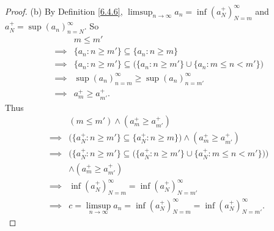 \begin{proof}{(b)}
    By Definition \ref{6.4.6}, \(\limsup_{n \to \infty} a_n = \inf(a_N^+)_{N = m}^\infty\) and \(a_N^+ = \sup(a_n)_{n = N}^\infty\).
    So
    \begin{align*}
                 & m \leq m'                                                                                \\
        \implies & \{a_n : n \geq m'\} \subseteq \{a_n : n \geq m\}                                         \\
        \implies & \{a_n : n \geq m'\} \subseteq \big(\{a_n : n \geq m'\} \cup \{a_n : m \leq n < m'\}\big) \\
        \implies & \sup(a_n)_{n = m}^\infty \geq \sup(a_n)_{n = m'}^\infty                                  \\
        \implies & a_m^+ \geq a_{m'}^+.
    \end{align*}
    Thus
    \begin{align*}
                 & (m \leq m') \land (a_m^+ \geq a_{m'}^+)                                                                    \\
        \implies & \big(\{a_N^+ : n \geq m'\} \subseteq \{a_N^+ : n \geq m\}\big) \land (a_m^+ \geq a_{m'}^+)                 \\
        \implies & \bigg(\{a_N^+ : n \geq m'\} \subseteq \big(\{a_N^+ : n \geq m'\} \cup \{a_N^+ : m \leq n < m'\}\big)\bigg) \\
                 & \land (a_m^+ \geq a_{m'}^+)                                                                                \\
        \implies & \inf(a_N^+)_{N = m}^\infty = \inf(a_N^+)_{N = m'}^\infty                                                   \\
        \implies & c = \limsup_{n \to \infty} a_n = \inf(a_N^+)_{N = m}^\infty = \inf(a_N^+)_{N = m'}^\infty.
    \end{align*}
\end{proof}


